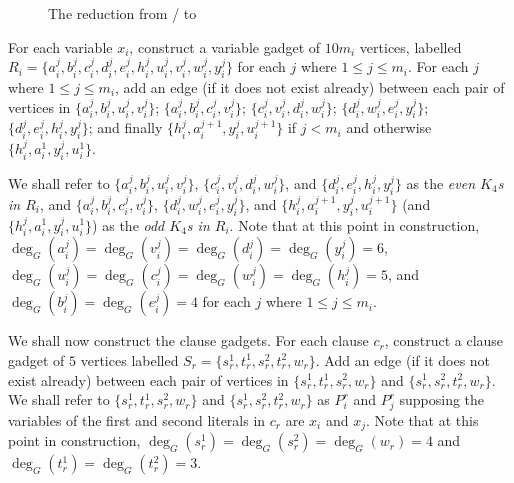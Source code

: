 \begin{figure}
    \centering
    
    \caption{The reduction from \maxtwosatthree/ to \edkfour}
    \label{fig:krpacking_edkfour}
\end{figure}

For each variable $x_i$, construct a variable gadget of $10 m_i$ vertices, labelled $R_i = \{ a_i^j, b_i^j, c_i^j, d_i^j, e_i^j, h_i^j, u_i^j, v_i^j, w_i^j, y_i^j \}$ for each $j$ where $1\leq j \leq m_i$. For each $j$ where $1\leq j \leq m_i$, add an edge (if it does not exist already) between each pair of vertices in $\{ a_i^j, b_i^j, u_i^j, v_i^j \}$; $\{ a_i^j, b_i^j, c_i^j, v_i^j \}$; $\{ c_i^j, v_i^j, d_i^j, w_i^j \}$; $\{ d_i^j, w_i^j, e_i^j, y_i^j \}$; $\{ d_i^j, e_i^j, h_i^j, y_i^j \}$; and finally $\{ h_i^j, a_i^{j+1}, y_i^j, u_i^{j+1} \}$ if $j < m_i$ and otherwise $\{ h_i^j, a_i^1, y_i^j, u_i^1 \}$.

We shall refer to $\{ a_i^j, b_i^j, u_i^j, v_i^j \}$, $\{ c_i^j, v_i^j, d_i^j, w_i^j \}$, and $\{ d_i^j, e_i^j, h_i^j, y_i^j \}$ as the \emph{even $K_4$s in $R_i$}, and $\{ a_i^j, b_i^j, c_i^j, v_i^j \}$, $\{ d_i^j, w_i^j, e_i^j, y_i^j \}$, and $\{ h_i^j, a_i^{j+1}, y_i^j, u_i^{j+1} \}$ (and $\{ h_i^j, a_i^1, y_i^j, u_i^1 \}$) as the \emph{odd $K_4$s in $R_i$}. Note that at this point in construction, $\deg_{G}(a_i^j) = \deg_{G}(v_i^j) = \deg_{G}(d_i^j) = \deg_{G}(y_i^j) = 6$, $\deg_{G}(u_i^j) = \deg_{G}(c_i^j) = \deg_{G}(w_i^j) = \deg_{G}(h_i^j) = 5$, and $\deg_{G}(b_i^j) = \deg_{G}(e_i^j) = 4$ for each $j$ where $1\leq j \leq m_i$. 

We shall now construct the clause gadgets. For each clause $c_r$, construct a clause gadget of $5$ vertices labelled $S_r = \{ s_r^1, t_r^1, s_r^2, t_r^2, w_r \}$. Add an edge (if it does not exist already) between each pair of vertices in $\{ s_r^1, t_r^1, s_r^2, w_r \}$ and $\{ s_r^1, s_r^2, t_r^2, w_r \}$. We shall refer to $\{ s_r^1, t_r^1, s_r^2, w_r \}$ and $\{ s_r^1, s_r^2, t_r^2, w_r \}$ as $P_i^r$ and $P_j^r$ supposing the variables of the first and second literals in $c_r$ are $x_i$ and $x_j$. Note that at this point in construction, $\deg_{G}(s_r^1) = \deg_{G}(s_r^2) = \deg_{G}(w_r) = 4$ and $\deg_{G}(t_r^1) = \deg_{G}(t_r^2) = 3$.

